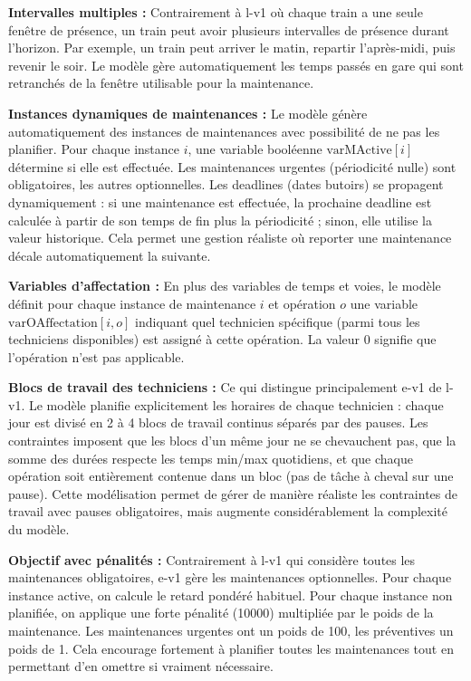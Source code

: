 \textbf{Intervalles multiples :} Contrairement à l-v1 où chaque train a une seule fenêtre de présence, un train peut avoir plusieurs intervalles de présence durant l'horizon. Par exemple, un train peut arriver le matin, repartir l'après-midi, puis revenir le soir. Le modèle gère automatiquement les temps passés en gare qui sont retranchés de la fenêtre utilisable pour la maintenance.

\textbf{Instances dynamiques de maintenances :} Le modèle génère automatiquement des instances de maintenances avec possibilité de ne pas les planifier. Pour chaque instance $i$, une variable booléenne $\text{varMActive}[i]$ détermine si elle est effectuée. Les maintenances urgentes (périodicité nulle) sont obligatoires, les autres optionnelles. Les deadlines (dates butoirs) se propagent dynamiquement : si une maintenance est effectuée, la prochaine deadline est calculée à partir de son temps de fin plus la périodicité ; sinon, elle utilise la valeur historique. Cela permet une gestion réaliste où reporter une maintenance décale automatiquement la suivante.

\textbf{Variables d'affectation :} En plus des variables de temps et voies, le modèle définit pour chaque instance de maintenance $i$ et opération $o$ une variable $\text{varOAffectation}[i, o]$ indiquant quel technicien spécifique (parmi tous les techniciens disponibles) est assigné à cette opération. La valeur 0 signifie que l'opération n'est pas applicable.

\textbf{Blocs de travail des techniciens :} Ce qui distingue principalement e-v1 de l-v1. Le modèle planifie explicitement les horaires de chaque technicien : chaque jour est divisé en 2 à 4 blocs de travail continus séparés par des pauses. Les contraintes imposent que les blocs d'un même jour ne se chevauchent pas, que la somme des durées respecte les temps min/max quotidiens, et que chaque opération soit entièrement contenue dans un bloc (pas de tâche à cheval sur une pause). Cette modélisation permet de gérer de manière réaliste les contraintes de travail avec pauses obligatoires, mais augmente considérablement la complexité du modèle.

\textbf{Objectif avec pénalités :} Contrairement à l-v1 qui considère toutes les maintenances obligatoires, e-v1 gère les maintenances optionnelles. Pour chaque instance active, on calcule le retard pondéré habituel. Pour chaque instance non planifiée, on applique une forte pénalité (10000) multipliée par le poids de la maintenance. Les maintenances urgentes ont un poids de 100, les préventives un poids de 1. Cela encourage fortement à planifier toutes les maintenances tout en permettant d'en omettre si vraiment nécessaire.

